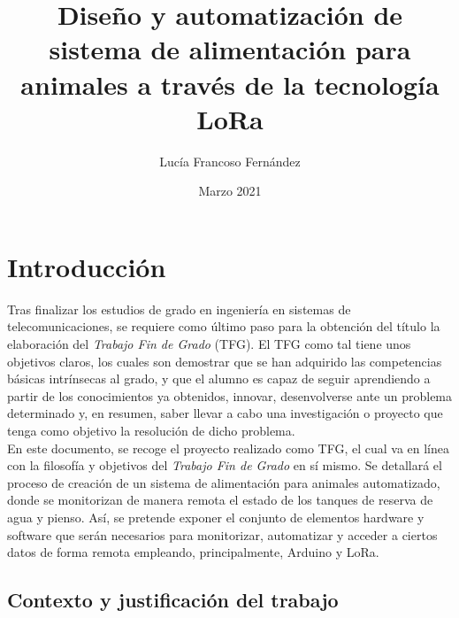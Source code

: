\documentclass[12pt]{article}
\begin{document}

	\title{Diseño y automatización de sistema de alimentación para animales a través de la tecnología LoRa}
	\author{Lucía Francoso Fernández}
	\date{Marzo 2021}
	
	\maketitle
	\pagebreak
	
	\tableofcontents
	
	\pagebreak

	\listoffigures

	\listoftables
	
	\section[Introducción]{Introducción} %
	
	Tras finalizar los estudios de grado en ingeniería en sistemas de telecomunicaciones, se requiere como último paso para la obtención del título la elaboración del \textit{Trabajo Fin de Grado} (TFG). 
	El TFG como tal tiene unos objetivos claros, los cuales son demostrar que se han adquirido las competencias básicas intrínsecas al grado, y que el alumno es capaz de seguir aprendiendo a partir de los conocimientos ya obtenidos, innovar, desenvolverse ante un problema determinado y, en resumen, saber llevar a cabo una investigación o proyecto que tenga como objetivo la resolución de dicho problema. \\
	
	\noindent En este documento, se recoge el proyecto realizado como TFG,  el cual va en línea con la filosofía y objetivos del \textit{Trabajo Fin de Grado} en sí mismo. Se detallará el proceso de creación de un sistema de alimentación para animales automatizado, donde se monitorizan de manera remota el estado de los tanques de reserva de agua y pienso. Así, se pretende exponer el conjunto de elementos hardware y software que serán necesarios para monitorizar, automatizar y acceder a ciertos datos de forma remota empleando, principalmente, Arduino y LoRa.\\
	
	
	\subsection[Contexto y justificación del trabajo]{Contexto y justificación del trabajo}
\end{document}
